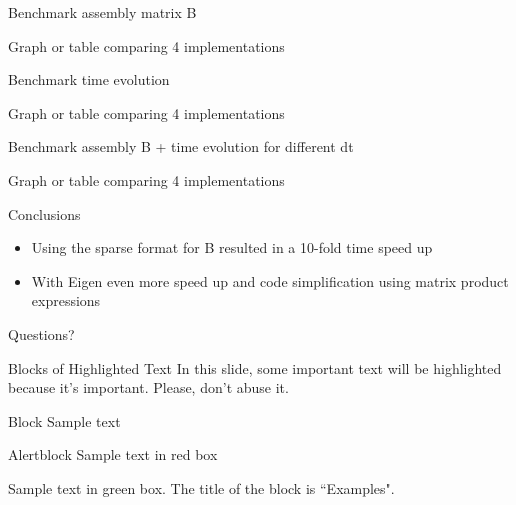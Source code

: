 \documentclass[aspectratio=169,xcolor=dvipsnames]{beamer}
\begin{document}

\begin{frame}{Benchmark assembly matrix B}
   
   Graph or table comparing 4 implementations
   
\end{frame}


\begin{frame}{Benchmark time evolution}
   
   Graph or table comparing 4 implementations
   
\end{frame}


\begin{frame}{Benchmark assembly B + time evolution for different dt }
   
   Graph or table comparing 4 implementations
   
\end{frame}


\begin{frame}{Conclusions}
   \begin{itemize}
	  \item Using the sparse format for B resulted in a 10-fold time speed up
	  \item With Eigen even more speed up and code simplification using matrix product expressions
   \end{itemize}
\end{frame}


\begin{frame}
    \Huge{\centerline{Questions?}}
\end{frame}


\begin{frame}{Blocks of Highlighted Text}
    In this slide, some important text will be \alert{highlighted} because it's important. Please, don't abuse it.

    \begin{block}{Block}
        Sample text
    \end{block}

    \begin{alertblock}{Alertblock}
        Sample text in red box
    \end{alertblock}

    \begin{examples}
        Sample text in green box. The title of the block is ``Examples".
    \end{examples}
\end{frame}
\end{document}
